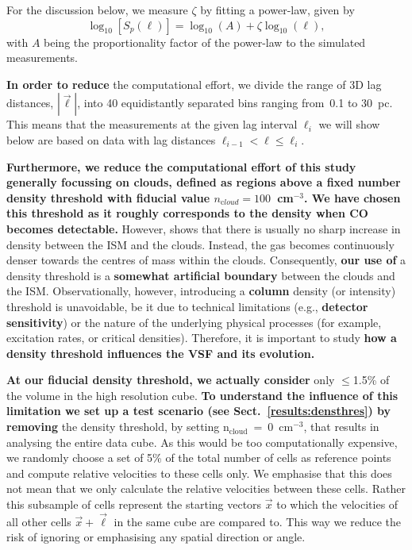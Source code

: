 For the discussion below, we measure $\zeta$ by fitting a power-law,
given by
\begin{equation}
	\log_{10}\left[ S_p(\ell) \right] = \log_{10}\left(A\right) + \zeta \log_{10}(\ell) ,
	\label{equ:method:fitting}
\end{equation}
with $A$ being the proportionality factor of the power-law to the simulated measurements.

\textbf{In order to reduce} the computational effort, we divide the range of 3D lag distances, $|\vec{\ell}|$, into 40 equidistantly separated bins ranging from~0.1 to 30~pc.
This means that the measurements at the given lag interval $\ell_i$ we will show below are based on data with lag distances $\ell_{i-1} < \ell \leq \ell_i$.

\textbf{Furthermore, we reduce the computational effort of this study generally focussing on clouds, defined as regions above a fixed number density threshold with fiducial value $n_{\mathrm cloud} = 100$~cm$^{-3}$.  We have chosen this threshold as it roughly corresponds to the density when CO becomes detectable. }
However,  shows that there is usually no sharp increase in density between the ISM and the clouds. 
Instead, the gas becomes continuously denser towards the centres of mass within the clouds. 
Consequently, \textbf{our use of} a density threshold is a \textbf{somewhat artificial boundary} between the clouds and the ISM. Observationally, however, introducing a \textbf{column} density (or intensity) threshold is unavoidable, be it due to technical limitations (e.g., \textbf{detector sensitivity}) or the nature of the underlying physical processes (for example, excitation rates, or critical densities).
Therefore, it is important to study \textbf{how a density threshold influences the VSF and its evolution.}

\textbf{At our fiducial density threshold, we actually consider} only $\leq$1.5\% of the volume in the high resolution cube.
\textbf{To understand the influence of this limitation we set up a test scenario (see Sect.~\ref{results:densthres}) by removing} the density threshold, by setting n$_\mathrm{cloud}$~=~0~cm$^{-3}$, that results in analysing the entire data cube.
As this would be too computationally expensive, we randomly choose a set of 5\% of the total number of cells as reference points and compute relative velocities to these cells only.
We emphasise that this does not mean that we only calculate the relative velocities between these cells.
Rather this subsample of cells represent the starting vectors $\vec{x}$ to which the velocities of all other cells $\vec{x} + \vec{\ell}$ in the same cube are compared to.
This way we reduce the risk of ignoring or emphasising any spatial direction or angle.

